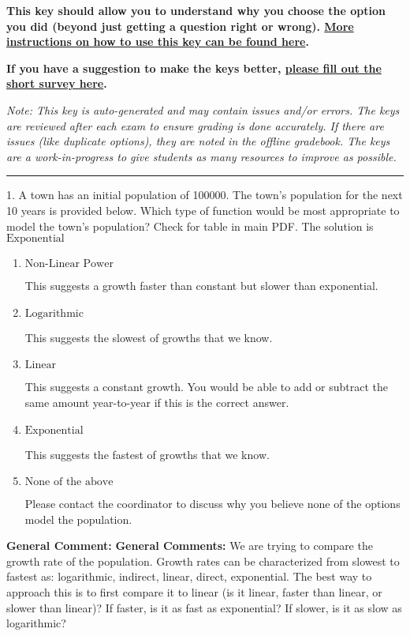 \documentclass{extbook}[14pt]
\begin{document}
\textbf{This key should allow you to understand why you choose the option you did (beyond just getting a question right or wrong). \href{https://xronos.clas.ufl.edu/mac1105spring2020/courseDescriptionAndMisc/Exams/LearningFromResults}{More instructions on how to use this key can be found here}.}

\textbf{If you have a suggestion to make the keys better, \href{https://forms.gle/CZkbZmPbC9XALEE88}{please fill out the short survey here}.}

\textit{Note: This key is auto-generated and may contain issues and/or errors. The keys are reviewed after each exam to ensure grading is done accurately. If there are issues (like duplicate options), they are noted in the offline gradebook. The keys are a work-in-progress to give students as many resources to improve as possible.}

\rule{\textwidth}{0.4pt}

1. A town has an initial population of 100000. The town's population for the next 10 years is provided below. Which type of function would be most appropriate to model the town's population?
Check for table in main PDF. 
The solution is $ \text{Exponential} $ 

\begin{enumerate}[label=\Alph*.] 
\item $ \text{Non-Linear Power} $ 

 This suggests a growth faster than constant but slower than exponential. 
\item $ \text{Logarithmic} $ 

 This suggests the slowest of growths that we know. 
\item $ \text{Linear} $ 

 This suggests a constant growth. You would be able to add or subtract the same amount year-to-year if this is the correct answer. 
\item $ \text{Exponential} $ 

 This suggests the fastest of growths that we know. 
\item $ \text{None of the above} $ 

 Please contact the coordinator to discuss why you believe none of the options model the population. 
\end{enumerate} 
 
\textbf{General Comment:} \textbf{General Comments:} We are trying to compare the growth rate of the population. Growth rates can be characterized from slowest to fastest as: logarithmic, indirect, linear, direct, exponential. The best way to approach this is to first compare it to linear (is it linear, faster than linear, or slower than linear)? If faster, is it as fast as exponential? If slower, is it as slow as logarithmic? 
\end{document}
